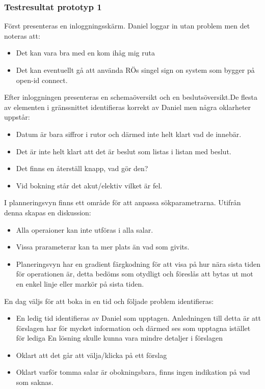 \documentclass[a4paper,10pt]{article}
\begin{document}
\subsubsection{Testresultat prototyp 1}
Först presenteras en inloggningsskärm. Daniel loggar in utan problem men det noteras att:
\begin{itemize}
  \item Det kan vara bra med en kom ihåg mig ruta
  \item Det kan eventuellt gå att använda RÖs singel sign on system som bygger på open-id connect.
\end{itemize}
Efter inloggningen presenteras en schemaöversikt och en beslutsöversikt.De flesta av elementen i gränssnittet identifieras korrekt av Daniel men några oklarheter uppstår:
\begin{itemize}
\item Datum är bara siffror i rutor och därmed inte helt klart vad de innebär.
\item Det är inte helt klart att det är beslut som listas i listan med beslut.
\item Det finns en återställ knapp, vad gör den?
\item Vid bokning står det akut/elektiv vilket är fel.
\end{itemize}
I planneringsvyn finns ett område för att anpassa sökparametrarna. Utifrån denna skapas en diskussion:
\begin{itemize}
\item Alla operaioner kan inte utföras i alla salar.
\item Vissa prarameterar kan ta mer plats än vad som givits.
\item Planeringsvyn har en gradient färgkodning för att visa på hur nära sista tiden för operationen är, detta bedöms som otydligt och föreslås att bytas ut mot en enkel linje eller markör på sista tiden.
\end{itemize}

En dag väljs för att boka in en tid och följade problem identifieras: \\
\begin{itemize}
\item En ledig tid identifieras av Daniel som upptagen. Anledningen till detta är att förslagen har för mycket information och därmed ses som upptagna istället för lediga
En lösning skulle kunna vara mindre detaljer i förslagen
\item Oklart att det går att välja/klicka på ett förslag
\item Oklart varför tomma salar är obokningsbara, finns ingen indikation på vad som saknas.
\end{itemize}
\end{document}
